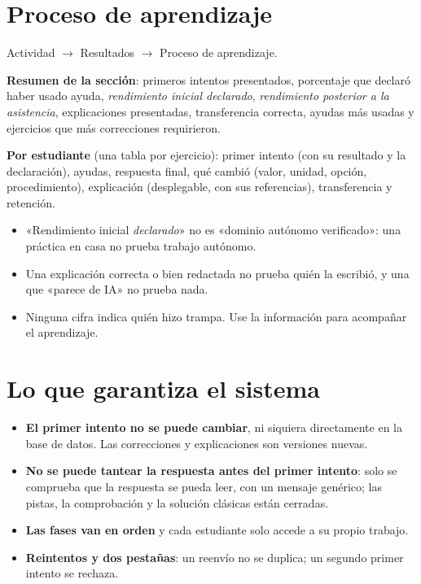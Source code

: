 \documentclass[11pt,a4paper,oneside]{book}
\newcommand{\ruta}[1]{\textsf{#1}}
\begin{document}
\section{Proceso de aprendizaje}
\ruta{Actividad $\rightarrow$ Resultados $\rightarrow$ Proceso de aprendizaje}.

\textbf{Resumen de la sección}: primeros intentos presentados, porcentaje que declaró haber usado ayuda,
\emph{rendimiento inicial declarado}, \emph{rendimiento posterior a la asistencia}, explicaciones presentadas,
transferencia correcta, ayudas más usadas y ejercicios que más correcciones requirieron.

\textbf{Por estudiante} (una tabla por ejercicio): primer intento (con su resultado y la declaración), ayudas, respuesta
final, qué cambió (valor, unidad, opción, procedimiento), explicación (desplegable, con sus referencias), transferencia
y retención.

\begin{importante}
\begin{itemize}
  \item «Rendimiento inicial \emph{declarado}» no es «dominio autónomo verificado»: una práctica en casa no prueba
        trabajo autónomo.
  \item Una explicación correcta o bien redactada no prueba quién la escribió, y una que «parece de IA» no prueba nada.
  \item Ninguna cifra indica quién hizo trampa. Use la información para acompañar el aprendizaje.
\end{itemize}
\end{importante}

\section{Lo que garantiza el sistema}
\begin{itemize}
  \item \textbf{El primer intento no se puede cambiar}, ni siquiera directamente en la base de datos. Las
        correcciones y explicaciones son versiones nuevas.
  \item \textbf{No se puede tantear la respuesta antes del primer intento}: solo se comprueba que la respuesta se
        pueda leer, con un mensaje genérico; las pistas, la comprobación y la solución clásicas están cerradas.
  \item \textbf{Las fases van en orden} y cada estudiante solo accede a su propio trabajo.
  \item \textbf{Reintentos y dos pestañas}: un reenvío no se duplica; un segundo primer intento se rechaza.
\end{itemize}
\end{document}

